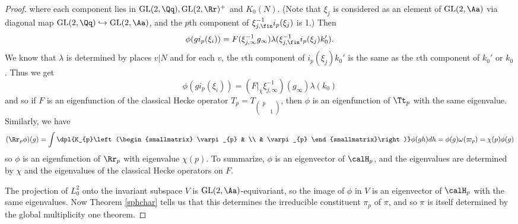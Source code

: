 \documentclass{article}
\newcommand{\GL}{\mathrm{GL}}
\newcommand{\smat}[4]{\left(\begin{smallmatrix} #1 & #2 \\ #3 & #4 \end{smallmatrix}\right)}
\begin{document}
\begin{proof}
where each component lies in $\GL(2, \Qq), \GL(2, \Rr)^{+}$ and $K_{0}(N)$. (Note that $\xi_{j}$ is considered as an element of $\GL(2, \Aa)$ via diagonal map $\GL(2, \Qq)\hookrightarrow \GL(2, \Aa)$, and the $p$th component of $\xi_{j, \fin}^{-1}i_{p}(\xi_j)$ is 1.)
Then 
$$\phi(g i_{p}(\xi_{i})) = F(\xi_{j, \infty}^{-1}g_{\infty}) \lambda(\xi_{j, \fin}^{-1} i_{p}(\xi_j) k_{0}').$$
We know that $\lambda$ is determined by places $v|N$ and for each $v$, the $v$th component of $i_{p}(\xi_{j})k_{0}'$ is the same as the $v$th component of $k_{0}'$ or $k_{0}$. 
Thus we get
$$
\phi(gi_{p}(\xi_{i})) = (F|_{\chi}\xi_{j, \infty}^{-1})(g_{\infty})\lambda(k_{0})
$$
and so if $F$ is an eigenfunction of the classical Hecke operator $T_{p} = T_{\smat{p}{}{}{1}}$, then $\phi$ is an eigenfunction of $\Tt_p$ with the same eigenvalue. 
Similarly, we have
$$
(\Rr_{p}\phi)(g) = \int\dpl{K_{p}\smat{\varpi_{p}}{}{}{\varpi_{p}}} \phi(gh)dh = \phi(g) \omega(\varpi_{p}) = \chi(p)\phi(g)
$$
so $\phi$ is an eigenfunction of $\Rr_{p}$ with eigenvalue $\chi(p)$. 
To summarize, $\phi$ is an eigenvector of $\calH_{p}$, and the eigenvalues are determined by $\chi$ and the eigenvalues of the classical Hecke operators on $F$. 

The projection of $L_{0}^{2}$ onto the invariant subspace $V$ is $\GL(2, \Aa)$-equivariant, so the image of $\phi$ in $V$ is an eigenvector of $\calH_p$ with the same eigenvalues. 
Now Theorem \ref{sphchar} tells us that this determines the irreducible constituent $\pi_{p}$ of $\pi$, and so $\pi$ is itself determined by the global multiplicity one theorem. 
\end{proof}
\end{document}
